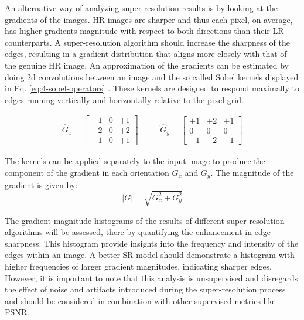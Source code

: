         An alternative way of analyzing super-resolution results is by looking at the gradients of the images. 
        HR images are sharper and thus each pixel, on average, has higher gradients magnitude with respect to both directions than their LR counterparts.
        A super-resolution algorithm should increase the sharpness of the edges, resulting in a gradient distribution that aligns more closely with that of the genuine HR image.
        An approximation of the gradients can be estimated by doing 2d convolutions between an image and the so called Sobel kernels displayed in Eq. \ref{eq:4-sobel-operators} \cite{Sobel1990AnI3}.
        These kernels are designed to respond maximally to edges running vertically and horizontally relative to the pixel grid.
        
        \begin{equation}
            \begin{array}{ccc}
            \hat{G}_x = \begin{bmatrix}
            -1 & 0 & +1 \\
            -2 & 0 & +2 \\
            -1 & 0 & +1
            \end{bmatrix}
            &
            \quad
            &
            \hat{G}_y = \begin{bmatrix}
            +1 & +2 & +1 \\
             0 &  0 &  0 \\
            -1 & -2 & -1
            \end{bmatrix}
            \end{array}
            \label{eq:4-sobel-operators}
        \end{equation}
    
         The kernels can be applied separately to the input image to produce the component of the gradient in each orientation $G_x$ and $G_y$. The magnitude of the gradient  is given by: 
         \begin{equation}
             |G| = \sqrt{G_x^2 + G_y^2}
             \label{eq:4-gradient_magnitude}
         \end{equation}

         The gradient magnitude histograms of the results of different super-resolution algorithms will be assessed, there by quantifying the enhancement in edge sharpness.
         This histogram provide insights into the frequency and intensity of the edges within an image.
         A better SR model should demonstrate a histogram with higher frequencies of larger gradient magnitudes, indicating sharper edges.
         However, it is important to note that this analysis is unsupervised and disregards the effect of noise and artifacts introduced during the super-resolution process and should be considered in combination with other supervised metrics like PSNR.

